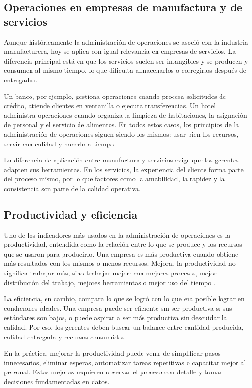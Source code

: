 \subsection{Operaciones en empresas de manufactura y de servicios}
Aunque históricamente la administración de operaciones se asoció con la industria manufacturera, hoy se aplica con igual relevancia en empresas de servicios. La diferencia principal está en que los servicios suelen ser intangibles y se producen y consumen al mismo tiempo, lo que dificulta almacenarlos o corregirlos después de entregados.

Un banco, por ejemplo, gestiona operaciones cuando procesa solicitudes de crédito, atiende clientes en ventanilla o ejecuta transferencias. Un hotel administra operaciones cuando organiza la limpieza de habitaciones, la asignación de personal y el servicio de alimentos. En todos estos casos, los principios de la administración de operaciones siguen siendo los mismos: usar bien los recursos, servir con calidad y hacerlo a tiempo \parencite{chase2014}.

La diferencia de aplicación entre manufactura y servicios exige que los gerentes adapten sus herramientas. En los servicios, la experiencia del cliente forma parte del proceso mismo, por lo que factores como la amabilidad, la rapidez y la consistencia son parte de la calidad operativa.

\subsection{Productividad y eficiencia}
Uno de los indicadores más usados en la administración de operaciones es la productividad, entendida como la relación entre lo que se produce y los recursos que se usaron para producirlo. Una empresa es más productiva cuando obtiene más resultados con los mismos o menos recursos. Mejorar la productividad no significa trabajar más, sino trabajar mejor: con mejores procesos, mejor distribución del trabajo, mejores herramientas o mejor uso del tiempo \parencite{heizer2014}.

La eficiencia, en cambio, compara lo que se logró con lo que era posible lograr en condiciones ideales. Una empresa puede ser eficiente sin ser productiva si sus estándares son bajos, o puede aspirar a ser más productiva sin descuidar la calidad. Por eso, los gerentes deben buscar un balance entre cantidad producida, calidad entregada y recursos consumidos.

En la práctica, mejorar la productividad puede venir de simplificar pasos innecesarios, eliminar esperas, automatizar tareas repetitivas o capacitar mejor al personal. Estas mejoras requieren observar el proceso con detalle y tomar decisiones fundamentadas en datos.
